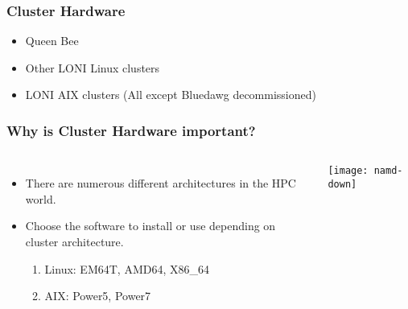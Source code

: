 \documentclass[slidestop,mathserif,compress,xcolor=svgnames,table]{beamer}
\begin{document}
\begin{frame}
  \frametitle{\small Cluster Hardware}
  \begin{itemize}
    \item Queen Bee 
    \item Other LONI Linux clusters
    \item LONI AIX clusters (All except Bluedawg decommissioned)
  \end{itemize}
\end{frame}

\begin{frame}
  \frametitle{\small Why is Cluster Hardware important?} 
  \begin{columns}
    \column{5cm}
    \begin{itemize}
      \item There are numerous different architectures in the HPC world.
      \item Choose the software to install or use depending on cluster architecture.
      \begin{enumerate}
	\item Linux: EM64T, AMD64, X86\_64
	\item AIX: Power5, Power7
      \end{enumerate}
    \end{itemize}
    \column{7cm}
    \vspace{-1cm}
    \begin{center}
      \texttt{[image: namd-down]}
    \end{center}
  \end{columns}
\end{frame}
\end{document}

